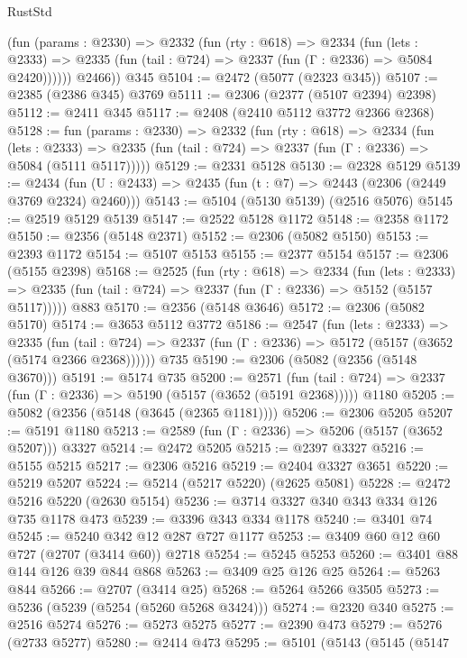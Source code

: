 \begin{lexlean}{RustStd}
\begin{coremodule}
          (fun (params : @2330) =>
          @2332
            (fun (rty : @618) =>
            @2334
              (fun (lets : @2333) =>
              @2335 (fun (tail : @724) => @2337 (fun (Γ : @2336) => @5084 @2420))))))
        @2466))
    @345
@5104 := @2472 (@5077 (@2323 @345))
@5107 := @2385 (@2386 @345) @3769
@5111 := @2306 (@2377 (@5107 @2394) @2398)
@5112 := @2411 @345
@5117 := @2408 (@2410 @5112 @3772 @2366 @2368)
@5128 := fun (params : @2330) =>
  @2332
    (fun (rty : @618) =>
    @2334
      (fun (lets : @2333) =>
      @2335 (fun (tail : @724) => @2337 (fun (Γ : @2336) => @5084 (@5111 @5117)))))
@5129 := @2331 @5128
@5130 := @2328 @5129
@5139 := @2434 (fun (U : @2433) => @2435 (fun (t : @7) => @2443 (@2306 (@2449 @3769 @2324) @2460)))
@5143 := @5104 (@5130 @5139) (@2516 @5076)
@5145 := @2519 @5129 @5139
@5147 := @2522 @5128 @1172
@5148 := @2358 @1172
@5150 := @2356 (@5148 @2371)
@5152 := @2306 (@5082 @5150)
@5153 := @2393 @1172
@5154 := @5107 @5153
@5155 := @2377 @5154
@5157 := @2306 (@5155 @2398)
@5168 := @2525
    (fun (rty : @618) =>
    @2334
      (fun (lets : @2333) =>
      @2335 (fun (tail : @724) => @2337 (fun (Γ : @2336) => @5152 (@5157 @5117)))))
    @883
@5170 := @2356 (@5148 @3646)
@5172 := @2306 (@5082 @5170)
@5174 := @3653 @5112 @3772
@5186 := @2547
    (fun (lets : @2333) =>
    @2335
      (fun (tail : @724) => @2337 (fun (Γ : @2336) => @5172 (@5157 (@3652 (@5174 @2366 @2368))))))
    @735
@5190 := @2306 (@5082 (@2356 (@5148 @3670)))
@5191 := @5174 @735
@5200 := @2571
    (fun (tail : @724) => @2337 (fun (Γ : @2336) => @5190 (@5157 (@3652 (@5191 @2368)))))
    @1180
@5205 := @5082 (@2356 (@5148 (@3645 (@2365 @1181))))
@5206 := @2306 @5205
@5207 := @5191 @1180
@5213 := @2589 (fun (Γ : @2336) => @5206 (@5157 (@3652 @5207))) @3327
@5214 := @2472 @5205
@5215 := @2397 @3327
@5216 := @5155 @5215
@5217 := @2306 @5216
@5219 := @2404 @3327 @3651
@5220 := @5219 @5207
@5224 := @5214 (@5217 @5220) (@2625 @5081)
@5228 := @2472 @5216 @5220 (@2630 @5154)
@5236 := @3714 @3327 @340 @343 @334 @126 @735 @1178 @473
@5239 := @3396 @343 @334 @1178
@5240 := @3401 @74
@5245 := @5240 @342 @12 @287 @727 @1177
@5253 := @3409 @60 @12 @60 @727 (@2707 (@3414 @60)) @2718
@5254 := @5245 @5253
@5260 := @3401 @88 @144 @126 @39 @844 @868
@5263 := @3409 @25 @126 @25
@5264 := @5263 @844
@5266 := @2707 (@3414 @25)
@5268 := @5264 @5266 @3505
@5273 := @5236 (@5239 (@5254 (@5260 @5268 @3424)))
@5274 := @2320 @340
@5275 := @2516 @5274
@5276 := @5273 @5275
@5277 := @2390 @473
@5279 := @5276 (@2733 @5277)
@5280 := @2414 @473
@5295 := @5101
    (@5143
      (@5145
        (@5147

\end{coremodule}
\end{lexlean}
